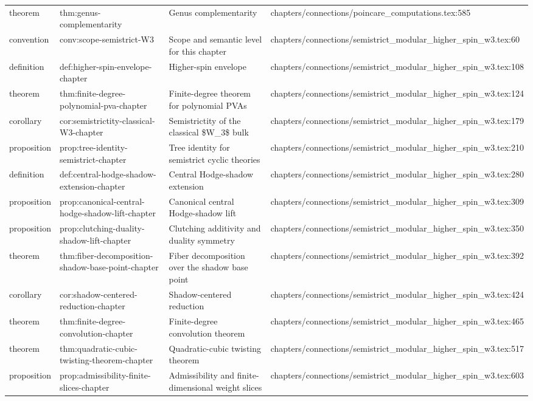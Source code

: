 \documentclass[11pt]{article}
\begin{document}
\begin{longtable}{L{0.10\textwidth}L{0.26\textwidth}L{0.42\textwidth}L{0.22\textwidth}}
theorem & thm:genus-complementarity & Genus complementarity & chapters/connections/poincare\_computations.tex:585\\
convention & conv:scope-semistrict-W3 & Scope and semantic level for this chapter & chapters/connections/semistrict\_modular\_higher\_spin\_w3.tex:60\\
definition & def:higher-spin-envelope-chapter & Higher-spin envelope & chapters/connections/semistrict\_modular\_higher\_spin\_w3.tex:108\\
theorem & thm:finite-degree-polynomial-pva-chapter & Finite-degree theorem for polynomial PVAs & chapters/connections/semistrict\_modular\_higher\_spin\_w3.tex:124\\
corollary & cor:semistrictity-classical-W3-chapter & Semistrictity of the classical \$W\_3\$ bulk & chapters/connections/semistrict\_modular\_higher\_spin\_w3.tex:179\\
proposition & prop:tree-identity-semistrict-chapter & Tree identity for semistrict cyclic theories & chapters/connections/semistrict\_modular\_higher\_spin\_w3.tex:210\\
definition & def:central-hodge-shadow-extension-chapter & Central Hodge-shadow extension & chapters/connections/semistrict\_modular\_higher\_spin\_w3.tex:280\\
proposition & prop:canonical-central-hodge-shadow-lift-chapter & Canonical central Hodge-shadow lift & chapters/connections/semistrict\_modular\_higher\_spin\_w3.tex:309\\
proposition & prop:clutching-duality-shadow-lift-chapter & Clutching additivity and duality symmetry & chapters/connections/semistrict\_modular\_higher\_spin\_w3.tex:350\\
theorem & thm:fiber-decomposition-shadow-base-point-chapter & Fiber decomposition over the shadow base point & chapters/connections/semistrict\_modular\_higher\_spin\_w3.tex:392\\
corollary & cor:shadow-centered-reduction-chapter & Shadow-centered reduction & chapters/connections/semistrict\_modular\_higher\_spin\_w3.tex:424\\
theorem & thm:finite-degree-convolution-chapter & Finite-degree convolution theorem & chapters/connections/semistrict\_modular\_higher\_spin\_w3.tex:465\\
theorem & thm:quadratic-cubic-twisting-theorem-chapter & Quadratic-cubic twisting theorem & chapters/connections/semistrict\_modular\_higher\_spin\_w3.tex:517\\
proposition & prop:admissibility-finite-slices-chapter & Admissibility and finite-dimensional weight slices & chapters/connections/semistrict\_modular\_higher\_spin\_w3.tex:603\\

\end{longtable}
\end{document}

